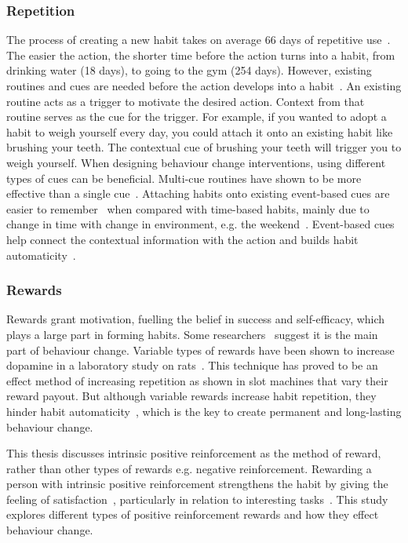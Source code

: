 \subsubsection*{Repetition}
The process of creating a new habit takes on average 66 days of repetitive use~\cite{article_how_habits_formed_modelling_habit_formation}. The easier the action, the shorter time before the action turns into a habit, from drinking water (18 days), to going to the gym (254 days). However, existing routines and cues are needed before the action develops into a habit~\cite{habits_event_cues_1, habits_event_cues_2}. An existing routine acts as a trigger to motivate the desired action. Context from that routine serves as the cue for the trigger. For example, if you wanted to adopt a habit to weigh yourself every day, you could attach it onto an existing habit like brushing your teeth. The contextual cue of brushing your teeth will trigger you to weigh yourself. When designing behaviour change interventions, using different types of cues can be beneficial. Multi-cue routines have shown to be more effective than a single cue~\cite{article_understanding_use_contextual_cues_design_impl}. Attaching habits onto existing event-based cues are easier to remember~\cite{article_implementation_intentions_multicue} when compared with time-based habits, mainly due to change in time with change in environment, e.g. the weekend~\cite{coaching_not_that_good}. Event-based cues help connect the contextual information with the action and builds habit automaticity~\cite{article_implementation_intentions}.

\subsubsection*{Rewards}
Rewards grant motivation, fuelling the belief in success and self-efficacy, which plays a large part in forming habits. Some researchers~\cite{article_a_self_efficacy} suggest it is the main part of behaviour change. Variable types of rewards have been shown to increase dopamine in a laboratory study on rats~\cite{variable_rewards_increases_dopamine}. This technique has proved to be an effect method of increasing repetition as shown in slot machines that vary their reward payout. But although variable rewards increase habit repetition, they hinder habit automaticity~\cite{variable_rewards_increases_dopamine}, which is the key to create permanent and long-lasting behaviour change.

This thesis discusses intrinsic positive reinforcement as the method of reward, rather than other types of rewards e.g. negative reinforcement. Rewarding a person with intrinsic positive reinforcement strengthens the habit by giving the feeling of satisfaction~\cite{article_promoting_habit_formation}, particularly in relation to interesting tasks~\cite{article_meta_analytic_review_intrinsic_motivation}. This study explores different types of positive reinforcement rewards and how they effect behaviour change.


